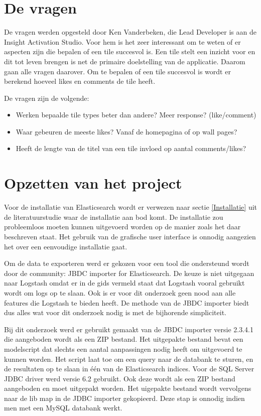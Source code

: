 \section{De vragen}
De vragen werden opgesteld door Ken Vanderbeken, die Lead Developer is aan de Insight Activation Studio. Voor hem is het zeer interessant om te weten of er aspecten zijn die bepalen of een tile succesvol is. Een tile stelt een inzicht voor en dit tot leven brengen is net de primaire doelstelling van de applicatie. Daarom gaan alle vragen daarover. Om te bepalen of een tile succesvol is wordt er berekend hoeveel likes en comments de tile heeft.

De vragen zijn de volgende:
\begin{itemize}
	\item Werken bepaalde tile types beter dan andere? Meer response? (like/comment) 
	\item Waar gebeuren de meeste likes? Vanaf de homepagina of op wall pages?
	\item Heeft de lengte van de titel van een tile invloed op aantal comments/likes? 
\end{itemize}

\section{Opzetten van het project}

Voor de installatie van Elasticsearch wordt er verwezen naar sectie \ref{Installatie} uit de literatuurstudie waar de installatie aan bod komt. De installatie zou probleemloos moeten kunnen uitgevoerd worden op de manier zoals het daar beschreven staat. Het gebruik van de grafische user interface is onnodig aangezien het over een eenvoudige installatie gaat.

Om de data te exporteren werd er gekozen voor een tool die ondersteund wordt door de community: JBDC importer for Elasticsearch. De keuze is niet uitgegaan naar Logstash omdat er in de gids vermeld staat dat Logstash vooral gebruikt wordt om logs op te slaan. Ook is er voor dit onderzoek geen nood aan alle features die Logstash te bieden heeft. De methode van de JBDC importer biedt dus alles wat voor dit onderzoek nodig is met de bijhorende simpliciteit.

Bij dit onderzoek werd er gebruikt gemaakt van de JBDC importer versie 2.3.4.1 die aangeboden wordt als een ZIP bestand. Het uitgepakte bestand bevat een modelscript dat slechts een aantal aanpassingen nodig heeft om uitgevoerd te kunnen worden. Het script laat toe om een query naar de databank te sturen, en de resultaten op te slaan in één van de Elasticsearch indices. Voor de SQL Server JDBC driver werd versie 6.2 gebruikt. Ook deze wordt als een ZIP bestand aangeboden en moet uitgepakt worden. Het uigepakte bestand wordt vervolgens naar de lib map in de JDBC importer gekopieerd. Deze stap is onnodig indien men met een MySQL databank werkt. 

